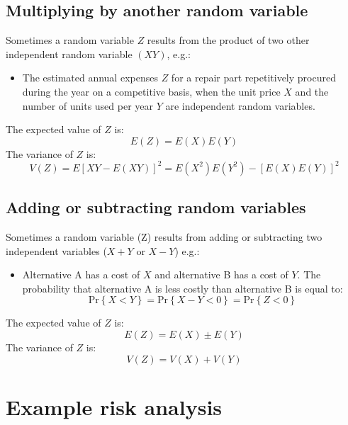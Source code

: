 \subsection{Multiplying by another random variable}
Sometimes a random variable $Z$ results from the product of two other independent random variable $(XY)$, e.g.:
\begin{itemize}
    \item The estimated annual expenses $Z$ for a repair part repetitively procured during the year on a competitive basis, when the unit price $X$ and the number of units used per year $Y$ are independent random variables.
\end{itemize}
The expected value of $Z$ is:
\begin{equation}
    E\left(Z\right) = E\left(X\right)E\left(Y\right)
\end{equation}
The variance of $Z$ is:
\begin{equation}
    V\left(Z\right) = E\left[XY - E\left(XY\right)\right]^2 = E\left(X^2\right)E\left(Y^2\right)- \left[E\left(X\right)E\left(Y\right)\right]^2
\end{equation}
\subsection{Adding or subtracting random variables}
Sometimes a random variable (Z) results from adding or subtracting two independent variables ($X+Y$ or $X-Y$) e.g.:
\begin{itemize}
    \item Alternative A has a cost of $X$ and alternative B has a cost of $Y$. The probability that alternative A is less costly than alternative B is equal to:
          \begin{equation}
              \textrm{Pr}\left\{X < Y \right\} = \textrm{Pr}\left\{ X-Y < 0\right\} = \textrm{Pr} \left\{ Z < 0\right\}
          \end{equation}
\end{itemize}
The expected value of $Z$ is:
\begin{equation}
    E\left(Z\right) = E\left(X\right) \pm E\left(Y\right)
\end{equation}
The variance of $Z$ is:
\begin{equation}
    V\left(Z\right) = V\left(X\right) + V\left(Y\right)
\end{equation}
\section{Example risk analysis}
